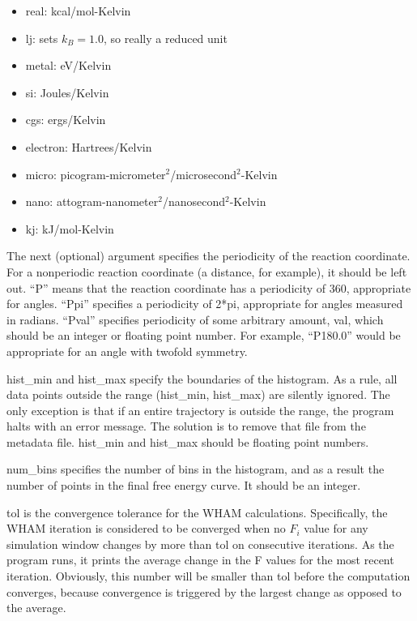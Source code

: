 \documentclass[12pt]{article}
\begin{document}
\begin{itemize}
    \item real: kcal/mol-Kelvin
    \item lj: sets $k_B = 1.0$, so really a reduced unit
    \item metal: eV/Kelvin
    \item si: Joules/Kelvin 
    \item cgs: ergs/Kelvin
    \item electron: Hartrees/Kelvin
    \item micro: picogram-micrometer$^2$/microsecond$^2$-Kelvin
    \item nano: attogram-nanometer$^2$/nanosecond$^2$-Kelvin
    \item kj: kJ/mol-Kelvin
\end{itemize}

The next (optional) argument specifies the periodicity of the reaction
coordinate.  For a nonperiodic reaction coordinate (a distance, for
example), it should be left out.  ``P'' means that the reaction coordinate
has a periodicity of 360, appropriate for angles. ``Ppi'' specifies a
periodicity of 2*pi, appropriate for angles measured in radians.  ``Pval''
specifies periodicity of some arbitrary amount, val, which should be an
integer or floating point number.  For example, ``P180.0'' would be
appropriate for an angle with twofold symmetry.

hist\_min and hist\_max specify the boundaries of the histogram.  As a rule,
all data points outside the range (hist\_min, hist\_max) are silently
ignored.  The only exception is that if an entire trajectory is outside the
range, the program halts with an error message.  The solution is to remove
that file from the metadata file.  hist\_min and hist\_max should be floating
point numbers.

num\_bins specifies the number of bins in the histogram, and as a result the
number of points in the final free energy curve.  It should be an integer.

tol is the convergence tolerance for the WHAM calculations.  Specifically,
the WHAM iteration is considered to be converged when no $F_i$ value for any
simulation window changes by more than tol on consecutive iterations.  As
the program runs, it prints the average change in the F values for the most
recent iteration.  Obviously, this number will be smaller than tol
before the computation converges, because convergence is triggered by the
largest change as opposed to the average.
\end{document}
